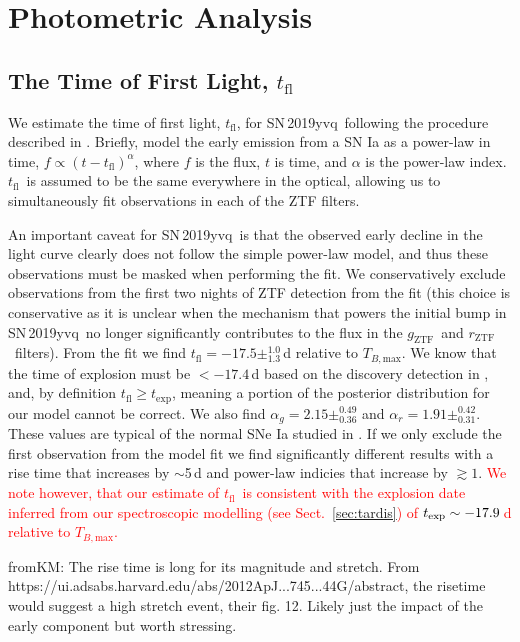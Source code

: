 \documentclass[twocolumn]{aastex63}
\newcommand{\fromkate}[1]{{\color{brown} fromKM: {#1}}}
\newcommand{\rztf}{$r_\mathrm{ZTF}$}
\newcommand{\gztf}{$g_\mathrm{ZTF}$}
\newcommand{\tfl}{$t_\mathrm{fl}$}
\newcommand{\tbmax}{$T_{B,\mathrm{max}}$}
\newcommand{\sn}{SN\,2019yvq}
\begin{document}
\section{Photometric Analysis}\label{sec:phot}

\subsection{The Time of First Light, \tfl}\label{sec:t_fl}

We estimate the time of first light, \tfl, for \sn\ following the procedure
described in \citet{Miller20}. Briefly, \citet{Miller20} model the early
emission from a SN Ia as a power-law in time, $f \propto (t -
t_\mathrm{fl})^\alpha$, where $f$ is the flux, $t$ is time, and $\alpha$ is
the power-law index. \tfl\ is assumed to be the same everywhere in the
optical, allowing us to simultaneously fit observations in each of the ZTF
filters.

An important caveat for \sn\ is that the observed early decline in the light
curve clearly does not follow the simple power-law model, and thus these
observations must be masked when performing the fit. We conservatively
exclude observations from the first two nights of ZTF detection from the fit
(this choice is conservative as it is unclear when the mechanism that powers
the initial bump in \sn\ no longer significantly contributes to the flux in
the \gztf\ and \rztf\ filters). From the fit we find \tfl$ = -17.5
\pm^{1.0}_{1.3}$\,d relative to \tbmax. We know that the time of explosion
must be $< -17.4$\,d based on the discovery detection in \citealt{Itagaki19},
and, by definition $t_\mathrm{fl} \ge t_\mathrm{exp}$, meaning a portion of
the posterior distribution for our model cannot be correct. We also find
$\alpha_g = 2.15 \pm^{0.49}_{0.36}$ and $\alpha_r = 1.91 \pm^{0.42}_{0.31}$.
These values are typical of the normal SNe Ia studied in \citet{Miller20}. If
we only exclude the first observation from the model fit we find
significantly different results with a rise time that increases by $\sim$5\,d
and power-law indicies that increase by $\gtrsim 1$. \textcolor{red}{We note however, that our estimate of \tfl\, is consistent with the explosion date inferred from our spectroscopic modelling (see Sect.~\ref{sec:tardis}) of $t_{\rm{exp}} \sim -17.9$\,d relative to \tbmax.}

\fromkate{The rise time is long for its magnitude and stretch. From https://ui.adsabs.harvard.edu/abs/2012ApJ...745...44G/abstract, the risetime would suggest a high stretch event, their fig. 12. Likely just the impact of the early component but worth stressing. }
\end{document}
